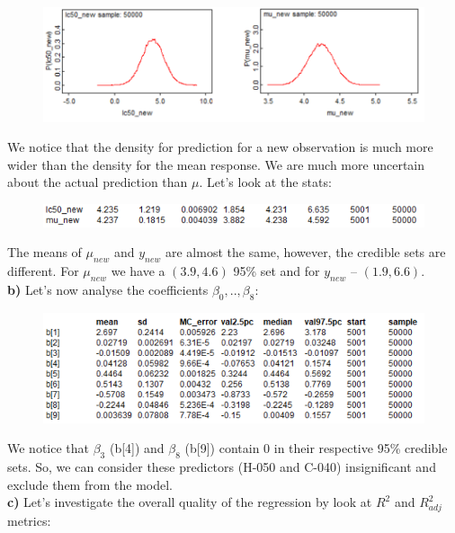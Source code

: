 \documentclass[a4 paper]{article}
\begin{document}
\begin{figure}[H]
	\includegraphics[scale=1.0]{q2}
	\centering
	\label{q2}
\end{figure}

We notice that the density for 
prediction for a new observation
is much more wider than the density for 
the  mean response. We are much more uncertain 
about the actual prediction than $\mu$.
Let's look at the stats:

\begin{figure}[H]
	\includegraphics[scale=1.0]{q2_2}
	\centering
	\label{q2_2}
\end{figure}

The means of $\mu_{new}$
and $y_{new}$ are almost the same, however, 
the credible sets are different. For $\mu_{new}$ 
we have a $(3.9, 4.6)$ 95\% set and 
for $y_{new}$ -- $(1.9, 6.6)$. \\


\textbf{b)} Let's now 
analyse the coefficients $\beta_0,..,\beta_8$:

\begin{figure}[H]
	\includegraphics[scale=1.0]{q2_3}
	\centering
	\label{q2_3}
\end{figure}

We notice that $\beta_3$ (b[4]) and $\beta_8$ (b[9])
contain 0 in their respective 95\% 
credible sets. So, we can consider these 
predictors (H-050 and C-040) insignificant 
and exclude them from the model. \\



\textbf{c)} Let's investigate the overall 
quality of the regression by look at 
$R^2$ and $R_{adj}^2$ metrics:
\end{document}
